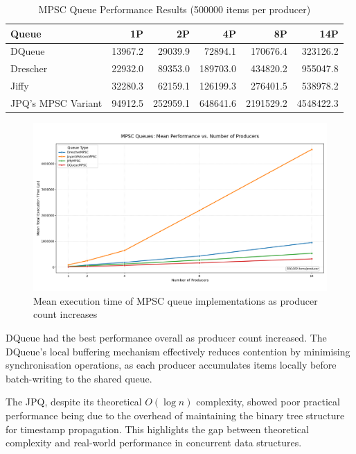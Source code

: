 \begin{table}[htb]
\centering
\caption{\ac{MPSC} Queue Performance Results (500000 items per producer)}
\label{tab:mpsc-results}
\begin{tabular}{@{}lrrrrr@{}}
\toprule
Queue & 1P & 2P & 4P & 8P & 14P \\
\midrule
DQueue & 13967.2 & 29039.9 & 72894.1 & 170676.4 & 323126.2 \\
Drescher & 22932.0 & 89353.0 & 189703.0 & 434820.2 & 955047.8 \\
Jiffy & 32280.3 & 62159.1 & 126199.3 & 276401.5 & 538978.2 \\
\ac{JPQ}'s \ac{MPSC} Variant & 94912.5 & 252959.1 & 648641.6 & 2191529.2 & 4548422.3 \\
\bottomrule
\end{tabular}
\end{table}

\begin{figure}[htb]
\centering
\caption{Mean execution time of MPSC queue implementations as producer count increases}
\label{fig:mpsc-mean-performance}
\includegraphics[width=\textwidth]{images/results/mpsc_mean_performance_vs_producers.png}
\end{figure}

DQueue had the best performance overall as producer count increased. The DQueue's local buffering mechanism effectively reduces contention by minimising synchronisation operations, as each producer accumulates items locally before batch-writing to the shared queue.

The \ac{JPQ}, despite its theoretical $O(\log n)$ complexity, showed poor practical performance being due to the overhead of maintaining the binary tree structure for timestamp propagation. This highlights the gap between theoretical complexity and real-world performance in concurrent data structures.

